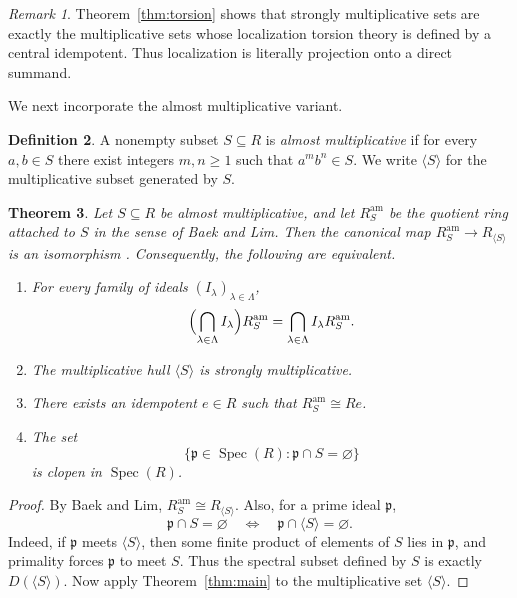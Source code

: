 \documentclass[11pt]{amsart}
\newtheorem{theorem}{Theorem}[section]
\theoremstyle{definition}
\newtheorem{definition}[theorem]{Definition}
\theoremstyle{remark}
\newtheorem{remark}[theorem]{Remark}
\newcommand{\Spec}{\operatorname{Spec}}
\begin{document}
\begin{remark}
Theorem~\ref{thm:torsion} shows that strongly multiplicative sets are exactly the multiplicative sets whose localization torsion theory is defined by a central idempotent.
Thus localization is literally projection onto a direct summand.
\end{remark}

We next incorporate the almost multiplicative variant.

\begin{definition}\cite{BaekLim}
A nonempty subset $S \subseteq R$ is \emph{almost multiplicative} if for every $a,b \in S$ there exist integers $m,n \geq 1$ such that $a^mb^n \in S$.
We write $\langle S\rangle$ for the multiplicative subset generated by $S$.
\end{definition}

\begin{theorem}\label{thm:almost}
Let $S \subseteq R$ be almost multiplicative, and let $R_S^{\mathrm{am}}$ be the quotient ring attached to $S$ in the sense of Baek and Lim.
Then the canonical map $R_S^{\mathrm{am}} \longrightarrow R_{\langle S\rangle}$ is an isomorphism \cite[Theorem~2.5]{BaekLim}.
Consequently, the following are equivalent.
\begin{enumerate}
\item For every family of ideals $(I_\lambda)_{\lambda \in \Lambda}$,
\[
\Bigl(\bigcap_{\lambda \in \Lambda} I_\lambda\Bigr)R_S^{\mathrm{am}}
=
\bigcap_{\lambda \in \Lambda} I_\lambda R_S^{\mathrm{am}}.
\]
\item The multiplicative hull $\langle S\rangle$ is strongly multiplicative.
\item There exists an idempotent $e \in R$ such that $R_S^{\mathrm{am}} \cong Re$.
\item The set
\[
\{\mathfrak p \in \Spec(R) : \mathfrak p \cap S=\varnothing\}
\]
is clopen in $\Spec(R)$.
\end{enumerate}
\end{theorem}

\begin{proof}
By Baek and Lim, $R_S^{\mathrm{am}} \cong R_{\langle S\rangle}$.
Also, for a prime ideal $\mathfrak p$,
\[
\mathfrak p \cap S=\varnothing
\quad\Longleftrightarrow\quad
\mathfrak p \cap \langle S\rangle=\varnothing.
\]
Indeed, if $\mathfrak p$ meets $\langle S\rangle$, then some finite product of elements of $S$ lies in $\mathfrak p$, and primality forces $\mathfrak p$ to meet $S$.
Thus the spectral subset defined by $S$ is exactly $D(\langle S\rangle)$.
Now apply Theorem~\ref{thm:main} to the multiplicative set $\langle S\rangle$.
\end{proof}
\end{document}
